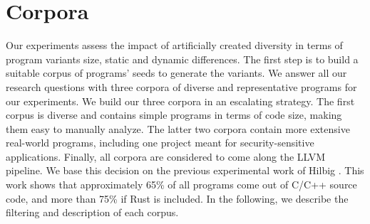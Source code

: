 

\section{Corpora}
\label{section:crow:corpora}

Our experiments assess the impact of artificially created diversity in terms of program variants size, static and dynamic differences. The first step is to build a suitable corpus of programs' seeds to generate the variants. We answer all our research questions with three corpora of diverse and representative programs for our experiments. 
We build our three corpora in an escalating strategy. The first corpus is diverse and contains simple programs in terms of code size, making them easy to manually analyze. The latter two corpora contain more extensive real-world programs, including one project meant for security-sensitive applications. Finally, all corpora are considered to come along the LLVM pipeline. We base this decision on the previous experimental work of Hilbig \etal \cite{Hilbig2021AnES}. This work shows that approximately 65\% of all \wasm programs come out of C/C++ source code, and more than 75\% if Rust is included. In the following, we describe the filtering and description of each corpus.

